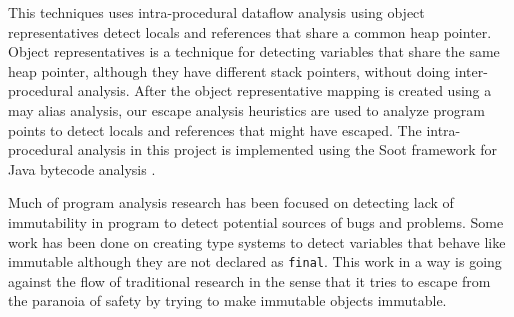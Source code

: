 This techniques uses intra-procedural dataflow analysis using object representatives \citep{ref:or} detect locals and references that share a common heap pointer. Object representatives is a technique for detecting variables that share the same heap pointer, although they have different stack pointers, without doing inter-procedural analysis. After the object representative mapping is created using a may alias analysis, our escape analysis heuristics are used to analyze program points to detect locals and references that might have escaped. The intra-procedural analysis in this project is implemented using the Soot framework for Java bytecode analysis \citep{ref:Soot}.

Much of program analysis research has been focused on detecting lack of immutability in program to detect potential sources of bugs and problems. Some work has been done on creating type systems to detect variables that behave like immutable although they are not declared as \texttt{final}\cite{ref:finalinference}. This work in a way is going against the flow of traditional research in the sense that it tries to escape from the paranoia of safety by trying to make immutable objects immutable.

